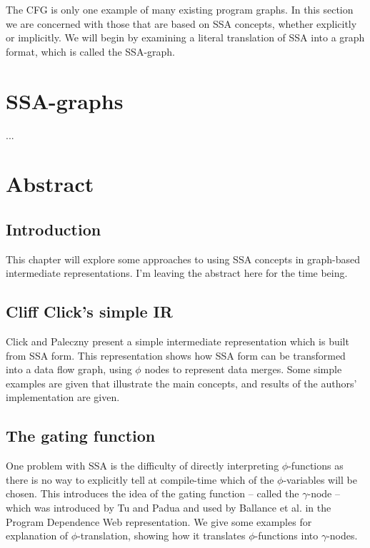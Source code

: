 The CFG is only one example of many existing program graphs. In this section we are concerned with those that are based on SSA concepts, whether explicitly or implicitly. We will begin by examining a literal translation of SSA into a graph format, which is called the SSA-graph.

\section{SSA-graphs}

...


\section*{Abstract}

\subsection*{Introduction}

This chapter will explore some approaches to using SSA concepts in graph-based intermediate representations. I'm leaving the abstract here for the time being.

\subsection*{Cliff Click's simple IR}

Click and Paleczny  \cite{202534} present a simple intermediate representation which is built from SSA form. This representation shows how SSA form can be transformed into a data flow graph, using $\phi$ nodes to represent data merges. Some simple examples are given that illustrate the main concepts, and results of the authors' implementation are given.

\subsection*{The gating function}

One problem with SSA is the difficulty of directly interpreting $\phi$-functions as there is no way to explicitly tell at compile-time which of the $\phi$-variables will be chosen. This introduces the idea of the gating function -- called the $\gamma$-node -- which was introduced by Tu and Padua \cite{207115} and used by Ballance et al. in the Program Dependence Web\cite{93578} representation. We give some examples for explanation of $\phi$-translation, showing how it translates $\phi$-functions into $\gamma$-nodes.


